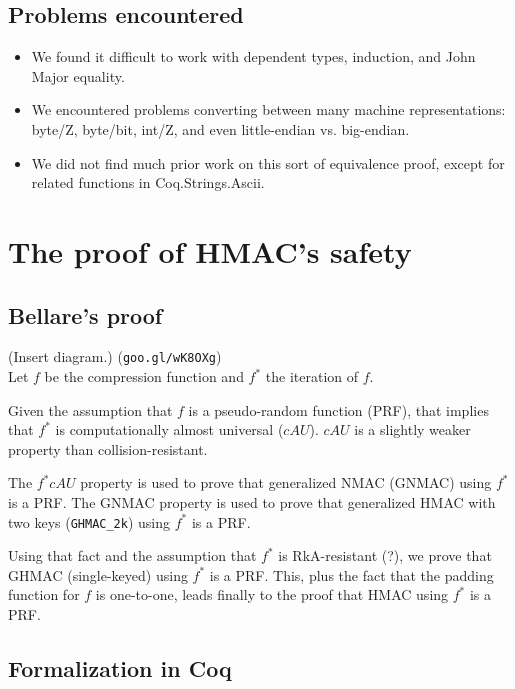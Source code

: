 \documentclass[twocolumn,showpacs,%
  nofootinbib,aps,superscriptaddress,%
  eqsecnum,prd,notitlepage,showkeys,10pt]{revtex4-1}
\begin{document}
\subsection{Problems encountered}

\begin{itemize}
\item We found it difficult to work with dependent types, induction, and John Major equality.
\item We encountered problems converting between many machine representations: byte/Z, byte/bit, int/Z, and even little-endian vs. big-endian.
\item We did not find much prior work on this sort of equivalence proof, except for related functions in Coq.Strings.Ascii.
\end{itemize}

\section{The proof of HMAC's safety}

\subsection{Bellare's proof}

(Insert diagram.) 
(\verb|goo.gl/wK8OXg|)
\\

Let $f$ be the compression function and $f^*$ the iteration of $f$.

Given the assumption that $f$ is a pseudo-random function (PRF), that implies that $f^*$ is computationally almost universal ($cAU$). $cAU$ is a slightly weaker property than collision-resistant.

The $f^* cAU$ property is used to prove that generalized NMAC (GNMAC) using $f^*$ is a PRF. The GNMAC property is used to prove that generalized HMAC with two keys (\verb|GHMAC_2k|) using $f^*$ is a PRF.

Using that fact and the assumption that $f^*$ is RkA-resistant (?), we prove that GHMAC (single-keyed) using $f^*$ is a PRF. This, plus the fact that the padding function for $f$ is one-to-one, leads finally to the proof that HMAC using $f^*$ is a PRF.



\subsection{Formalization in Coq}
\end{document}
